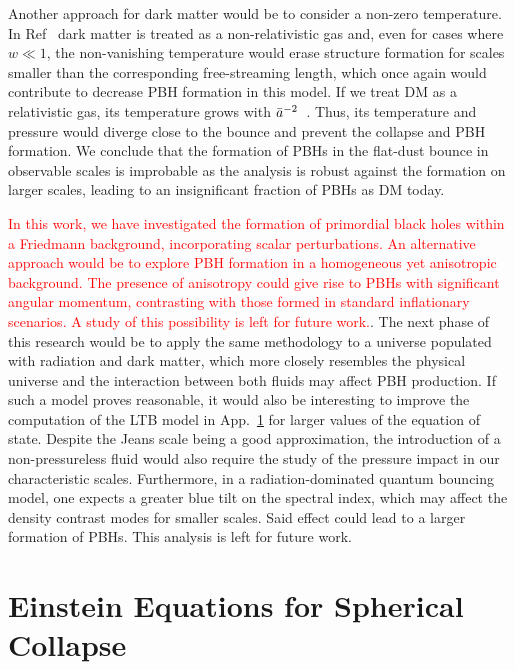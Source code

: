 \documentclass[a4paper,11pt]{article}
\begin{document}
Another approach for dark matter would be to consider a non-zero temperature. In Ref~\cite{Armendariz2014} dark matter is treated as a non-relativistic gas and, even for cases where $w\ll1$, the non-vanishing temperature would erase structure formation for scales smaller than the corresponding free-streaming length, which once again would contribute to decrease PBH formation in this model. If we treat DM as a relativistic gas, its temperature grows with $\Bar{a}^{-2}$~\cite{Mukhanov1992}. Thus, its temperature and pressure would diverge close to the bounce and prevent the collapse and PBH formation. We conclude that the formation of PBHs in the flat-dust bounce in observable scales is improbable as the analysis is robust against the formation on larger scales, leading to an insignificant fraction of PBHs as DM today.

\textcolor{red}{In this work, we have investigated the formation of primordial black
	holes within a Friedmann background, incorporating scalar perturbations. An alternative
	approach would be to explore PBH formation in a homogeneous yet anisotropic background.
	The presence of anisotropy could give rise to PBHs with significant angular momentum,
	contrasting with those formed in standard inflationary scenarios. A study of this
	possibility is left for future work.}. The next phase of this research would be to apply
the same methodology to a universe populated with radiation and dark matter, which more
closely resembles the physical universe and the interaction between both fluids may
affect PBH production. If such a model proves reasonable, it would also be interesting
to improve the computation of the LTB model in App.~\ref{appc} for larger values of the
equation of state. Despite the Jeans scale being a good approximation, the introduction
of a non-pressureless fluid would also require the study of the pressure impact in our
characteristic scales. Furthermore, in a radiation-dominated quantum bouncing model, one
expects a greater blue tilt on the spectral index, which may affect the density contrast
modes for smaller scales. Said effect could lead to a larger formation of PBHs. This
analysis is left for future work.




\appendix

\section{Einstein Equations for Spherical Collapse}
\label{appc}
\end{document}
